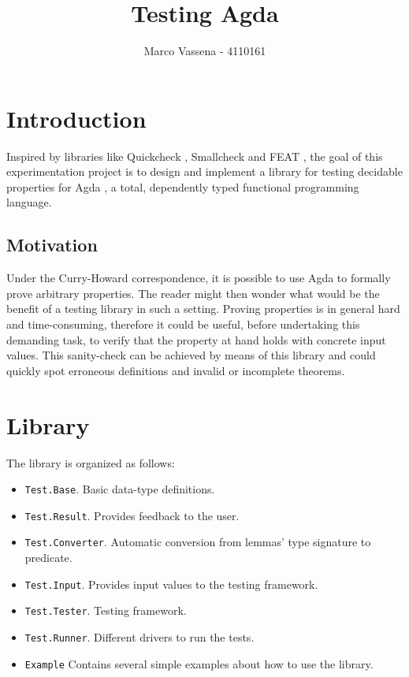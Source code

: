 \documentclass[10pt,a4paper]{article}
\author{Marco Vassena - 4110161}
\title{Testing Agda}
\begin{document}
\maketitle

\section{Introduction}
Inspired by libraries like Quickcheck \cite{QUICK}, Smallcheck \cite{SMALL} and FEAT \cite{FEAT}, the goal of this experimentation project is to design and implement a library for testing decidable properties for Agda \cite{AGDA}, a total, dependently typed functional programming language.

\subsection{Motivation}
Under the Curry-Howard correspondence, it is possible to use Agda to formally prove arbitrary properties. The reader might then wonder what would be the benefit of a testing library in such a setting. Proving properties is in general hard and time-consuming, therefore it could be useful, before undertaking this demanding task, to verify that the property at hand holds with concrete input values. This sanity-check can be achieved by means of this library and could quickly spot erroneous definitions and invalid or incomplete theorems.

\section{Library}
The library is organized as follows:
\begin{itemize}
	\item \texttt{Test.Base}. Basic data-type definitions.
	\item \texttt{Test.Result}. Provides feedback to the user.
	\item \texttt{Test.Converter}. Automatic conversion from lemmas' type signature to predicate.
	\item \texttt{Test.Input}. Provides input values to the testing framework.
	\item \texttt{Test.Tester}. Testing framework.
	\item \texttt{Test.Runner}. Different drivers to run the tests.
	\item \texttt{Example} Contains several simple examples about how to use the library.
\end{itemize}
\end{document}
